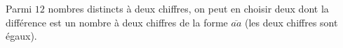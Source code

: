 Parmi $12$ nombres distincts à deux chiffres, on peut en choisir deux dont la différence est un nombre à deux chiffres de la forme $\overline{aa}$ (les deux chiffres sont égaux).
